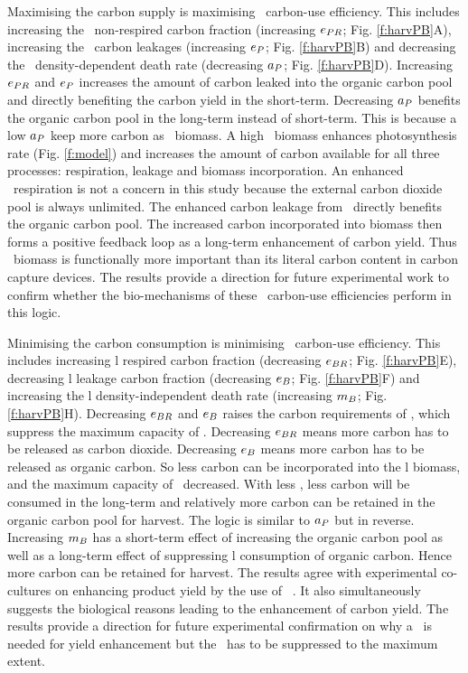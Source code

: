 \documentclass[env.tex]{subfiles}
\begin{document}
Maximising the carbon supply is maximising \phy\ carbon-use efficiency.  This includes increasing the \phy\ non-respired carbon fraction (increasing $e_{PR}$; Fig. \ref{f:harvPB}A), increasing the \phy\ carbon leakages (increasing $e_P$; Fig. \ref{f:harvPB}B) and decreasing the \phy\ density-dependent death rate (decreasing $a_P$; Fig. \ref{f:harvPB}D).  Increasing $e_{PR}$ and $e_P$ increases the amount of carbon leaked into the organic carbon pool and directly benefiting the carbon yield in the short-term.  Decreasing $a_P$ benefits the organic carbon pool in the long-term instead of short-term.  This is because a low $a_P$ keep more carbon as \phy\ biomass.  A high \phy\ biomass enhances photosynthesis rate (Fig. \ref{f:model}) and increases the amount of carbon available for all three processes: respiration, leakage and biomass incorporation.  An enhanced \phy\ respiration is not a concern in this study because the external carbon dioxide pool is always unlimited.  The enhanced carbon leakage from \phy\ directly benefits the organic carbon pool.  The increased carbon incorporated into biomass then forms a positive feedback loop as a long-term enhancement of carbon yield.  Thus \phy\ biomass is functionally more important than its literal carbon content in carbon capture devices.  The results provide a direction for future experimental work to confirm whether the bio-mechanisms of these \phy\ carbon-use efficiencies perform in this logic.

Minimising the carbon consumption is minimising \bac\ carbon-use efficiency.  This includes increasing \bac l respired carbon fraction (decreasing $e_{BR}$; Fig. \ref{f:harvPB}E), decreasing \bac l leakage carbon fraction (decreasing $e_B$; Fig. \ref{f:harvPB}F) and increasing the \bac l density-independent death rate (increasing $m_B$; Fig. \ref{f:harvPB}H).  Decreasing $e_{BR}$ and $e_B$ raises the carbon requirements of \bac, which suppress the maximum capacity of \bac.  Decreasing $e_{BR}$ means more carbon has to be released as carbon dioxide.  Decreasing $e_B$ means more carbon has to be released as organic carbon.  So less carbon can be incorporated into the \bac l biomass, and the maximum capacity of \bac\ decreased.  With less \bac, less carbon will be consumed in the long-term and relatively more carbon can be retained in the organic carbon pool for harvest.  The logic is similar to $a_P$ but in reverse.  Increasing $m_B$ has a short-term effect of increasing the organic carbon pool as well as a long-term effect of suppressing \bac l consumption of organic carbon.  Hence more carbon can be retained for harvest.  The results agree with experimental co-cultures on enhancing product yield by the use of \bac\ \autocite{fuentes2016impact,santos2014microalgal}.  It also simultaneously suggests the biological reasons leading to the enhancement of carbon yield.  The results provide a direction for future experimental confirmation on why a \bacm\ is needed for yield enhancement but the \bacm\ has to be suppressed to the maximum extent.
\end{document}
